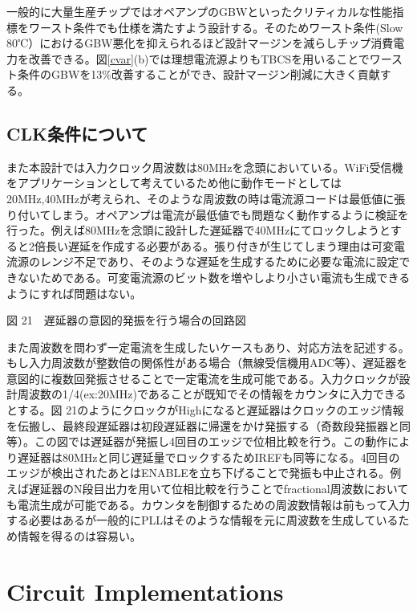\documentclass[letterpaper, 10 pt, conference]{ieeeconf}  %
\begin{document}
一般的に大量生産チップではオペアンプのGBWといったクリティカルな性能指標をワースト条件でも仕様を満たすよう設計する。そのためワースト条件(Slow 80℃）におけるGBW悪化を抑えられるほど設計マージンを減らしチップ消費電力を改善できる。図\ref{cvar}(b)では理想電流源よりもTBCSを用いることでワースト条件のGBWを13\%改善することができ、設計マージン削減に大きく貢献する。

\subsection{CLK条件について}
また本設計では入力クロック周波数は80MHzを念頭においている。WiFi受信機をアプリケーションとして考えているため他に動作モードとしては20MHz,40MHzが考えられ、そのような周波数の時は電流源コードは最低値に張り付いてしまう。オペアンプは電流が最低値でも問題なく動作するように検証を行った。例えば80MHzを念頭に設計した遅延器で40MHzにてロックしようとすると2倍長い遅延を作成する必要がある。張り付きが生じてしまう理由は可変電流源のレンジ不足であり、そのような遅延を生成するために必要な電流に設定できないためである。可変電流源のビット数を増やしより小さい電流も生成できるようにすれば問題はない。

図 21　遅延器の意図的発振を行う場合の回路図

また周波数を問わず一定電流を生成したいケースもあり、対応方法を記述する。もし入力周波数が整数倍の関係性がある場合（無線受信機用ADC等）、遅延器を意図的に複数回発振させることで一定電流を生成可能である。入力クロックが設計周波数の1/4(ex:20MHz)であることが既知でその情報をカウンタに入力できるとする。図 21のようにクロックがHighになると遅延器はクロックのエッジ情報を伝搬し、最終段遅延器は初段遅延器に帰還をかけ発振する（奇数段発振器と同等）。この図では遅延器が発振し4回目のエッジで位相比較を行う。この動作により遅延器は80MHzと同じ遅延量でロックするためIREFも同等になる。4回目のエッジが検出されたあとはENABLEを立ち下げることで発振も中止される。例えば遅延器のN段目出力を用いて位相比較を行うことでfractional周波数においても電流生成が可能である。カウンタを制御するための周波数情報は前もって入力する必要はあるが一般的にPLLはそのような情報を元に周波数を生成しているため情報を得るのは容易い。

\section{Circuit Implementations}
\end{document}
